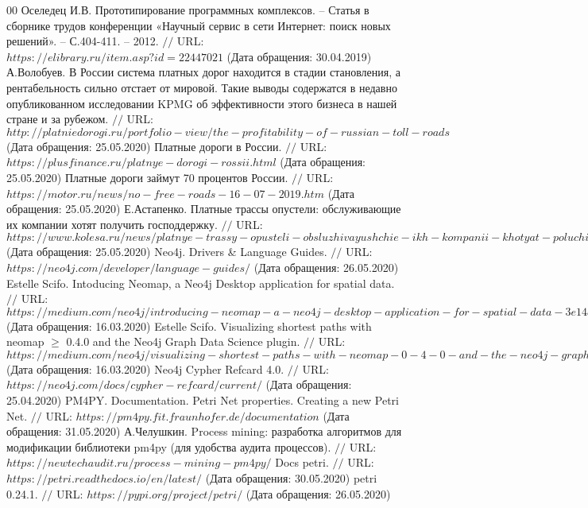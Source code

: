 \begin{thebibliography}{00}
	Оселедец И.В. Прототипирование программных комплексов. -- Статья в сборнике трудов конференции «Научный сервис в сети Интернет: поиск новых решений». -- С.404-411. -- 2012. $//$ URL: $https://elibrary.ru/item.asp?id=22447021$ (Дата обращения: 30.04.2019)
	А.Волобуев. В России система платных дорог находится в стадии становления, а рентабельность сильно отстает от мировой. Такие выводы содержатся в недавно опубликованном исследовании KPMG об эффективности этого бизнеса в нашей стране и за рубежом. $//$ URL: $http://platniedorogi.ru/portfolio-view/the-profitability-of-russian-toll-roads$ (Дата обращения: 25.05.2020)
	Платные дороги в России. $//$ URL: $https://plusfinance.ru/platnye-dorogi-rossii.html$ (Дата обращения: 25.05.2020)
	Платные дороги займут 70 процентов России. $//$ URL: $https://motor.ru/news/no-free-roads-16-07-2019.htm$ (Дата обращения: 25.05.2020)
	Е.Астапенко. Платные трассы опустели: обслуживающие их компании хотят получить господдержку. $//$ URL: $https://www.kolesa.ru/news/platnye-trassy-opusteli-obsluzhivayushchie-ikh-kompanii-khotyat-poluchit-gospodderzhku$ (Дата обращения: 25.05.2020)
	Neo4j. Drivers \& Language Guides. $//$ URL: $https://neo4j.com/developer/language-guides/$ (Дата обращения: 26.05.2020)
	Estelle Scifo. Intoducing Neomap, a Neo4j Desktop application for spatial data. $//$ URL: $https://medium.com/neo4j/introducing-neomap-a-neo4j-desktop-application-for-spatial-data-3e14aad59db2$ (Дата обращения: 16.03.2020)
	Estelle Scifo. Visualizing shortest paths with neomap $\geq$ 0.4.0 and the Neo4j Graph Data Science plugin. $//$ URL: $https://medium.com/neo4j/visualizing-shortest-paths-with-neomap-0-4-0-and-the-neo4j-graph-data-science-plugin-18db92f680de$ (Дата обращения: 16.03.2020)
	Neo4j Cypher Refcard 4.0. $//$ URL: $https://neo4j.com/docs/cypher-refcard/current/$ (Дата обращения: 25.04.2020)
	PM4PY. Documentation. Petri Net properties. Creating a new Petri Net. $//$ URL: $https://pm4py.fit.fraunhofer.de/documentation$ (Дата обращения: 31.05.2020)
	А.Челушкин. Process mining: разработка алгоритмов для модификации библиотеки pm4py (для удобства аудита процессов). $//$ URL: $https://newtechaudit.ru/process-mining-pm4py/$
	Docs petri. $//$ URL: $https://petri.readthedocs.io/en/latest/$ (Дата обращения: 30.05.2020)
	petri 0.24.1. $//$ URL: $https://pypi.org/project/petri/$ (Дата обращения: 26.05.2020)
\end{thebibliography}
